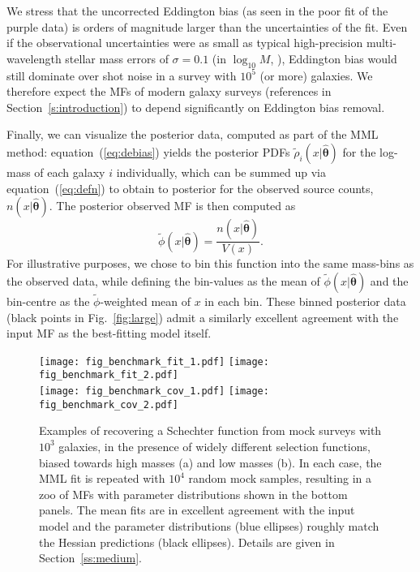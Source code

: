 \documentclass[a4paper,fleqn,usenatbib]{mnras}
\newcommand{\be}{\begin{equation}}
\newcommand{\ee}{\end{equation}}
\newcommand{\veff}{V}%
\newcommand{\fig}[1]{Fig.~\ref{fig:#1}}
\newcommand{\eq}[1]{equation~(\ref{eq:#1})}
\newcommand{\s}[1]{Section~\ref{s:#1}}
\renewcommand{\ss}[1]{Section~\ref{ss:#1}}
\newcommand{\para}{{\bm{\theta}}}
\begin{document}
We stress that the uncorrected Eddington bias (as seen in the poor fit of the purple data) is orders of magnitude larger than the uncertainties of the fit. Even if the observational uncertainties were as small as typical high-precision multi-wavelength stellar mass errors of $\sigma=0.1$ (in $\log_{10}M$, \citealp{Wright2017}), Eddington bias would still dominate over shot noise in a survey with $10^5$ (or more) galaxies. We therefore expect the MFs of modern galaxy surveys (references in \s{introduction}) to depend significantly on Eddington bias removal.

Finally, we can visualize the posterior data, computed as part of the MML method: \eq{debias} yields the posterior PDFs $\tilde\rho_i(x|\hat\para)$ for the log-mass of each galaxy $i$ individually, which can be summed up via \eq{defn} to obtain to posterior for the observed source counts, $n(x|\hat\para)$. The posterior observed MF is then computed as
%
\be
	\tilde\phi(x|\hat\para) = \frac{n(x|\hat\para)}{\veff(x)}.
\ee
%
For illustrative purposes, we chose to bin this function into the same mass-bins as the observed data, while defining the bin-values as the mean of $\tilde\phi(x|\hat\para)$ and the bin-centre as the $\tilde\phi$-weighted mean of $x$  in each bin. These binned posterior data (black points in \fig{large}) admit a similarly excellent agreement with the input MF as the best-fitting model itself.

\begin{figure*}
\begin{center}
\texttt{[image: fig\_benchmark\_fit\_1.pdf]}\hspace{5mm}
\texttt{[image: fig\_benchmark\_fit\_2.pdf]}\\ \vspace{2mm}\hspace{0.8mm}
\texttt{[image: fig\_benchmark\_cov\_1.pdf]}\hspace{5.1mm}
\texttt{[image: fig\_benchmark\_cov\_2.pdf]}\vspace{-3mm}
\caption{Examples of recovering a Schechter function from mock surveys with $10^3$ galaxies, in the presence of widely different selection functions, biased towards high masses (a) and low masses (b). In each case, the MML fit is repeated with $10^4$ random mock samples, resulting in a zoo of MFs with parameter distributions shown in the bottom panels. The mean fits are in excellent agreement with the input model and the parameter distributions (blue ellipses) roughly match the Hessian predictions (black ellipses). Details are given in \ss{medium}.}\label{fig:medium}
\end{center}
\end{figure*}
\end{document}
